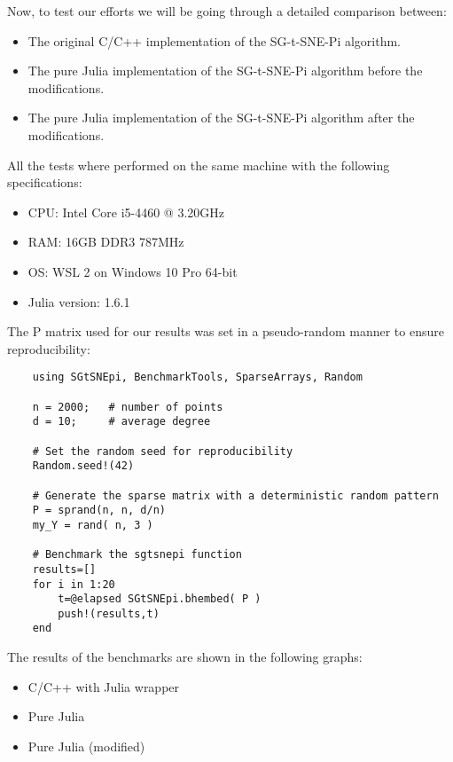 Now, to test our efforts we will be going through a detailed comparison between:
\begin{itemize}
    \item The original C/C++ implementation of the SG-t-SNE-Pi algorithm.
    \item The pure Julia implementation of the SG-t-SNE-Pi algorithm before the modifications.
    \item The pure Julia implementation of the SG-t-SNE-Pi algorithm after the modifications.
\end{itemize}
All the tests where performed on the same machine with the following specifications:
\begin{itemize}
    \item CPU: Intel Core i5-4460 @ 3.20GHz
    \item RAM: 16GB DDR3 787MHz
    \item OS: WSL 2 on Windows 10 Pro 64-bit
    \item Julia version: 1.6.1
\end{itemize}
The P matrix used for our results was set in a pseudo-random manner to ensure reproducibility:
\begin{verbatim} 
    using SGtSNEpi, BenchmarkTools, SparseArrays, Random
    
    n = 2000;   # number of points
    d = 10;     # average degree
    
    # Set the random seed for reproducibility
    Random.seed!(42)
    
    # Generate the sparse matrix with a deterministic random pattern
    P = sprand(n, n, d/n)
    my_Y = rand( n, 3 )

    # Benchmark the sgtsnepi function
    results=[]
    for i in 1:20
        t=@elapsed SGtSNEpi.bhembed( P )
        push!(results,t)
    end
\end{verbatim}
The results of the benchmarks are shown in the following graphs:
\begin{itemize}
    \item C/C++ with Julia wrapper

    \item Pure Julia 

    \item Pure Julia (modified)

\end{itemize}
